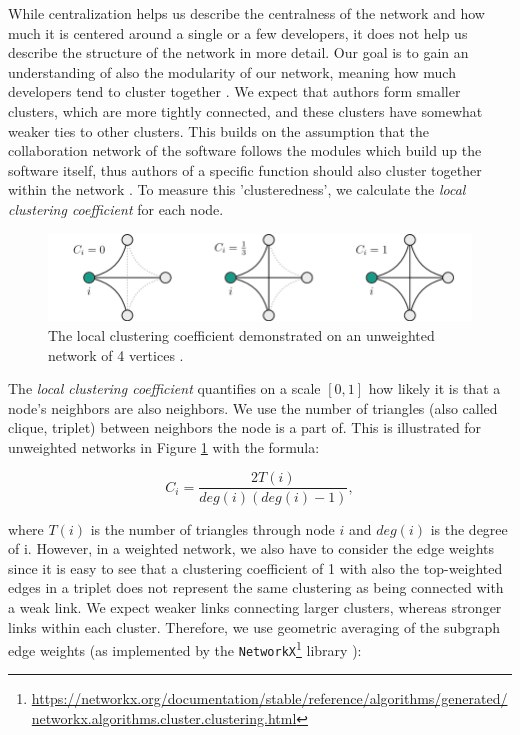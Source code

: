 While centralization helps us describe the centralness of the network and how much it is centered around a single or a few developers, it does not help us describe the structure of the network in more detail. Our goal is to gain an understanding of also the modularity of our network, meaning how much developers tend to cluster together \cite{joblinEvolutionaryTrendsDeveloper2017}. We expect that authors form smaller clusters, which are more tightly connected, and these clusters have somewhat weaker ties to other clusters. This builds on the assumption that the collaboration network of the software follows the modules which build up the software itself, thus authors of a specific function should also cluster together within the network \cite{conwayHowCommitteesInvent1968, joblinEvolutionaryTrendsDeveloper2017}. To measure this 'clusteredness', we calculate the \textit{local clustering coefficient} for each node.

\begin{figure}
    \centering
    \includegraphics[width=1\textwidth]{figures/loc_clust_coeff.png}
    \caption{The local clustering coefficient demonstrated on an unweighted network of 4 vertices \cite{jedrzejewskiRoleComplexNetworks2016}.}
    \label{fig:loc clust coeff}
\end{figure}

The \textit{local clustering coefficient} quantifies on a scale $[0, 1]$ how likely it is that a node's neighbors are also neighbors. We use the number of triangles (also called clique, triplet) between neighbors the node is a part of. This is illustrated for unweighted networks in Figure \ref{fig:loc clust coeff} with the formula:

\[ C_i = \frac{2T(i)}{deg(i)(deg(i)-1)}, \]

where $T(i)$ is the number of triangles through node $i$ and $deg(i)$ is the degree of i. However, in a weighted network, we also have to consider the edge weights since it is easy to see that a clustering coefficient of 1 with also the top-weighted edges in a triplet does not represent the same clustering as being connected with a weak link. We expect weaker links connecting larger clusters, whereas stronger links within each cluster. Therefore, we use geometric averaging of the subgraph edge weights (as implemented by the \texttt{NetworkX}\footnote{\url{https://networkx.org/documentation/stable/reference/algorithms/generated/networkx.algorithms.cluster.clustering.html}} library \cite{onnelaIntensityCoherenceMotifs2005}):


